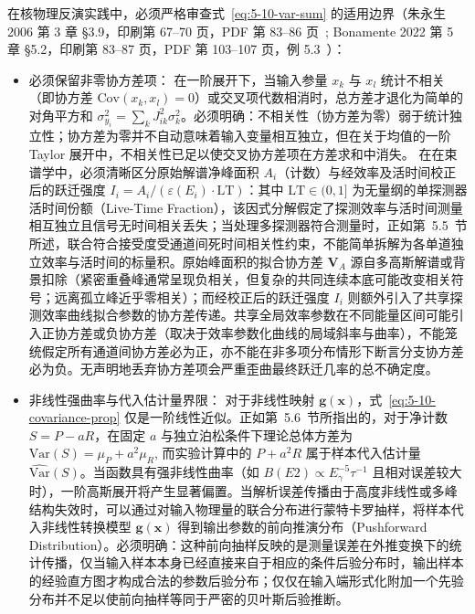 在核物理反演实践中，必须严格审查式~\eqref{eq:5-10-var-sum} 的适用边界（朱永生 2006 第 3 章 §3.9，印刷第 67--70 页，PDF 第 83--86 页~\cite{book-zhu-probability-statistics-in-physics}; Bonamente 2022 第 5 章 §5.2，印刷第 83--87 页，PDF 第 103--107 页，例 5.3~\cite{book-bonamente-statistics-scientific-data}）：
\begin{itemize}
\item 必须保留非零协方差项：
在一阶展开下，当输入参量 $x_k$ 与 $x_l$ 统计不相关（即协方差 $\mathrm{Cov}(x_k, x_l) = 0$）或交叉项代数相消时，总方差才退化为简单的对角平方和 $\sigma_{y_i}^2 = \sum_k J_{ik}^2 \sigma_k^2$。必须明确：不相关性（协方差为零）弱于统计独立性；协方差为零并不自动意味着输入变量相互独立，但在关于均值的一阶 Taylor 展开中，不相关性已足以使交叉协方差项在方差求和中消失。
在在束谱学中，必须清晰区分原始解谱净峰面积 $A_i$（计数）与经效率及活时间校正后的跃迁强度 $I_i = A_i / (\varepsilon(E_i) \cdot \mathrm{LT})$：其中 $\mathrm{LT} \in (0, 1]$ 为无量纲的单探测器活时间份额（Live-Time Fraction），该因式分解假定了探测效率与活时间测量相互独立且信号无时间相关丢失；当处理多探测器符合测量时，正如第~5.5~节所述，联合符合接受度受通道间死时间相关性约束，不能简单拆解为各单道独立效率与活时间的标量积。原始峰面积的拟合协方差 $\mathbf{V}_A$ 源自多高斯解谱或背景扣除（紧密重叠峰通常呈现负相关，但复杂的共同连续本底可能改变相关符号；远离孤立峰近乎零相关）；而经校正后的跃迁强度 $I_i$ 则额外引入了共享探测效率曲线拟合参数的协方差传递。共享全局效率参数在不同能量区间可能引入正协方差或负协方差（取决于效率参数化曲线的局域斜率与曲率），不能笼统假定所有通道间协方差必为正，亦不能在非多项分布情形下断言分支协方差必为负。无声明地丢弃协方差项会严重歪曲最终跃迁几率的总不确定度。
\item 非线性强曲率与代入估计量界限：
对于非线性映射 $\mathbf{g}(\mathbf{x})$，式~\eqref{eq:5-10-covariance-prop} 仅是一阶线性近似。正如第~5.6~节所指出的，对于净计数 $S = P - aR$，在固定 $a$ 与独立泊松条件下理论总体方差为 $\mathrm{Var}(S) = \mu_P + a^2 \mu_R$, 而实验计算中的 $P + a^2 R$ 属于样本代入估计量 $\widehat{\mathrm{Var}}(S)$。当函数具有强非线性曲率（如 $B(E2) \propto E_\gamma^{-5} \tau^{-1}$ 且相对误差较大时），一阶高斯展开将产生显著偏置。当解析误差传播由于高度非线性或多峰结构失效时，可以通过对输入物理量的联合分布进行蒙特卡罗抽样，将样本代入非线性转换模型 $\mathbf{g}(\mathbf{x})$ 得到输出参数的前向推演分布（Pushforward Distribution）。必须明确：这种前向抽样反映的是测量误差在外推变换下的统计传播，仅当输入样本本身已经直接来自于相应的条件后验分布时，输出样本的经验直方图才构成合法的参数后验分布；仅仅在输入端形式化附加一个先验分布并不足以使前向抽样等同于严密的贝叶斯后验推断。
\end{itemize}

